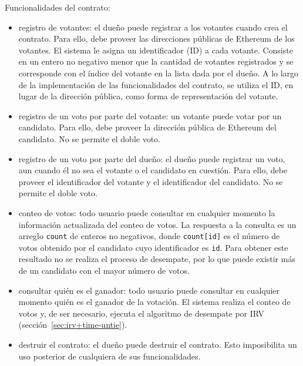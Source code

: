 Funcionalidades del contrato:
\begin{itemize}
    \item registro de votantes: el due\~no puede registrar a los votantes cuando crea el contrato. Para ello, debe proveer las direcciones p\'ublicas de Ethereum de los votantes. El sistema le asigna un identificador (ID) a cada votante. Consiste en un entero no negativo menor que la cantidad de votantes registrados y se corresponde con el \'indice del votante en la lista dada por el due\~no. A lo largo de la implementaci\'on de las funcionalidades del contrato, se utiliza el ID, en lugar de la direcci\'on p\'ublica, como forma  de representaci\'on del votante. 
    \item registro de un voto por parte del votante: un votante puede votar por un candidato. Para ello, debe proveer la direcci\'on p\'ublica de Ethereum del candidato. No se permite el doble voto.
    \item registro de un voto por parte del due\~no: el due\~no puede registrar un voto, aun cuando \'el no sea el votante o el candidato en cuesti\'on. Para ello, debe proveer el identificador del votante y el identificador del candidato. No se permite el doble voto.
    \item conteo de votos: todo usuario puede consultar en cualquier momento la informaci\'on actualizada del conteo de votos.  La respuesta a la consulta es un arreglo \lstinline{count} de enteros no negativos, donde \lstinline{count[id]} es el n\'umero de votos obtenido por el candidato cuyo identificador es \lstinline{id}. Para obtener este resultado no se realiza el proceso de desempate, por lo que puede existir m\'as de un candidato con el mayor n\'umero de votos.  
    \item consultar qui\'en es el ganador:  todo usuario puede consultar en cualquier momento qui\'en es el ganador de la votaci\'on. El sistema realiza el conteo de votos y, de ser necesario, ejecuta el algoritmo de desempate por IRV (secci\'on~\ref{sec:irv+time-untie}). 
    \item destruir el contrato: el due\~no puede destruir el contrato. Esto imposibilita un uso posterior de cualquiera de sus funcionalidades. 
\end{itemize}


